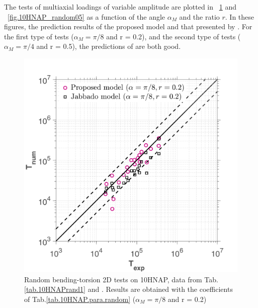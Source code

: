 \documentclass[3p,times,procedia,number]{elsarticle}
\newcommand{\figref}[1]{\figurename~\ref{#1}}
\begin{document}
The tests of multiaxial loadings of variable amplitude are plotted in \figref{fig.10HNAP_random02} and \figref{fig.10HNAP_random05} as a function of the angle $\alpha_{M}$ and the ratio $r$. In these figures, the prediction results of the proposed model and that presented by \cite{carpinteri2003multiaxial}. For the first type of tests ($\alpha_{M} = \pi/8$ and r = 0.2), and the second type of tests ($\alpha_{M} = \pi/4$ and r = 0.5), the predictions of \cite{carpinteri2003multiaxial} are both good. 
\begin{figure}[!h]
	\centering
	\includegraphics[width=\textwidth]{figures//HNAP_random_r02_error.png} 
	\caption{Random bending-torsion 2D tests on 10HNAP, data from Tab.\ref{tab.10HNAPrand1} and \cite{jabbado:pastel-00002116}. Results are obtained with the coefficients of Tab.\ref{tab.10HNAP.para.random} ($\alpha_{M} = \pi/8$ and r = 0.2)}
	\label{fig.10HNAP_random02}
\end{figure}
\end{document}
